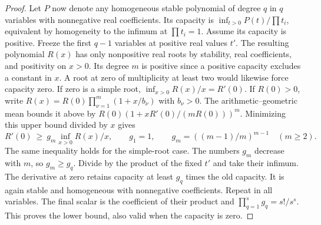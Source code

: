 \documentclass[a4paper,11pt]{article}
\theoremstyle{definition}
\theoremstyle{remark}
\numberwithin{equation}{section}
\begin{document}
\begin{proof}
Let \(P\) now denote any homogeneous stable polynomial of degree
\(q\) in \(q\) variables with nonnegative real coefficients. Its
capacity is \(\inf_{t>0}P(t)/\prod t_i\), equivalent by homogeneity
to the infimum at \(\prod t_i=1\). Assume its capacity is positive.
Freeze the first \(q-1\) variables at positive real values \(t'\).
The resulting polynomial \(R(x)\) has only nonpositive real roots
by stability, real coefficients, and positivity on \(x>0\).
Its degree \(m\) is positive since a positive capacity excludes
a constant in \(x\). A root at zero of multiplicity at least two
would likewise force capacity zero. If zero is a simple root,
\(\inf_{x>0} R(x)/x=R'(0)\). If \(R(0)>0\), write
\(R(x)=R(0)\prod_{\nu=1}^m(1+x/b_\nu)\) with \(b_\nu>0\).
The arithmetic--geometric mean bounds it above by
\(R(0)(1+xR'(0)/(mR(0)))^m\). Minimizing this upper bound divided
by \(x\) gives
\[
 R'(0)\ \ge\ g_m\inf_{x>0}R(x)/x,\qquad
 g_1=1,\qquad g_m=((m-1)/m)^{m-1}\quad(m\ge2).
\]
The same inequality holds for the simple-root case. The numbers
\(g_m\) decrease with \(m\), so \(g_m\ge g_q\).
Divide by the product of the fixed \(t'\) and take their infimum.
The derivative at zero retains capacity at least \(g_q\) times the
old capacity. It is again stable and homogeneous with nonnegative
coefficients. Repeat in all variables. The final scalar is the
coefficient of their product and \(\prod_{q=1}^s g_q=s!/s^s\).
This proves the lower bound, also valid when the capacity is zero.
\end{proof}
\end{document}
